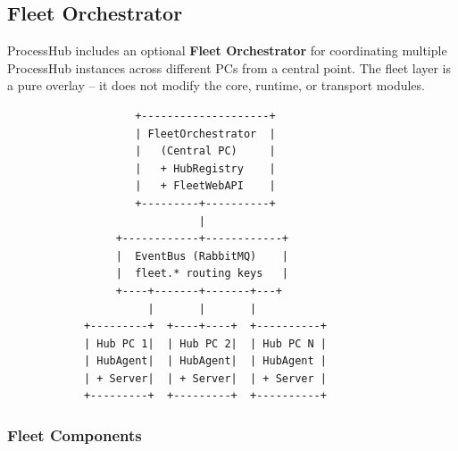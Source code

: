 \subsection{Fleet Orchestrator}

ProcessHub includes an optional \textbf{Fleet Orchestrator} for coordinating multiple ProcessHub
instances across different PCs from a central point. The fleet layer is a pure overlay -- it does
not modify the core, runtime, or transport modules.

\begin{verbatim}
                    +--------------------+
                    | FleetOrchestrator  |
                    |   (Central PC)     |
                    |   + HubRegistry    |
                    |   + FleetWebAPI    |
                    +---------+----------+
                              |
                 +------------+------------+
                 |  EventBus (RabbitMQ)    |
                 |  fleet.* routing keys   |
                 +----+-------+-------+---+
                      |       |       |
            +---------+  +----+----+  +----------+
            | Hub PC 1|  | Hub PC 2|  | Hub PC N |
            | HubAgent|  | HubAgent|  | HubAgent |
            | + Server|  | + Server|  | + Server |
            +---------+  +---------+  +----------+
\end{verbatim}

\subsubsection{Fleet Components}

